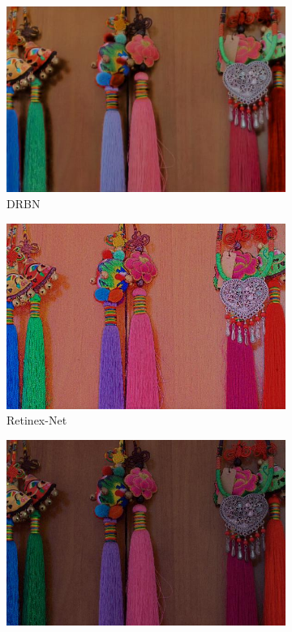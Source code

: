 \documentclass[a4paper]{ctexart}
\begin{document}
\begin{figure}[htb]
\begin{subfigure}{0.19\textwidth}
				\includegraphics[width=\linewidth]{picture/LLIE/Experiment/DRBN1}
				\captionsetup{font=scriptsize}
				\caption{DRBN}
				\label{fig: DRBN1}
			\end{subfigure}
			\begin{subfigure}{0.19\textwidth}
				\includegraphics[width=\linewidth]{picture/LLIE/Experiment/Retinex-Net1}
				\captionsetup{font=scriptsize}
				\caption{Retinex-Net}
				\label{fig: Retinex-Net1}
			\end{subfigure}
			\begin{subfigure}{0.19\textwidth}
				\includegraphics[width=\linewidth]{picture/LLIE/Experiment/RRDNet1}

\end{subfigure}
\end{figure}
\end{document}
